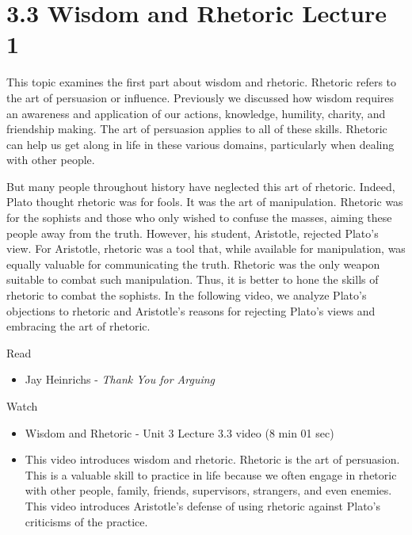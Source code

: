 \documentclass[
]{book}
\providecommand{\tightlist}{%
  \setlength{\itemsep}{0pt}\setlength{\parskip}{0pt}}
\begin{document}
\hypertarget{wisdom-and-rhetoric-lecture-1}{%
\section*{3.3 Wisdom and Rhetoric Lecture 1}\label{wisdom-and-rhetoric-lecture-1}}

This topic examines the first part about wisdom and rhetoric. Rhetoric refers to the art of persuasion or influence. Previously we discussed how wisdom requires an awareness and application of our actions, knowledge, humility, charity, and friendship making. The art of persuasion applies to all of these skills. Rhetoric can help us get along in life in these various domains, particularly when dealing with other people.

But many people throughout history have neglected this art of rhetoric. Indeed, Plato thought rhetoric was for fools. It was the art of manipulation. Rhetoric was for the sophists and those who only wished to confuse the masses, aiming these people away from the truth. However, his student, Aristotle, rejected Plato's view. For Aristotle, rhetoric was a tool that, while available for manipulation, was equally valuable for communicating the truth. Rhetoric was the only weapon suitable to combat such manipulation. Thus, it is better to hone the skills of rhetoric to combat the sophists. In the following video, we analyze Plato's objections to rhetoric and Aristotle's reasons for rejecting Plato's views and embracing the art of rhetoric.

Read

\begin{itemize}
\tightlist
\item
  Jay Heinrichs - \emph{Thank You for Arguing}
\end{itemize}

Watch

\begin{itemize}
\tightlist
\item
  Wisdom and Rhetoric - Unit 3 Lecture 3.3 video (8 min 01 sec)
\item
  This video introduces wisdom and rhetoric. Rhetoric is the art of persuasion. This is a valuable skill to practice in life because we often engage in rhetoric with other people, family, friends, supervisors, strangers, and even enemies. This video introduces Aristotle's defense of using rhetoric against Plato's criticisms of the practice.
\end{itemize}
\end{document}
